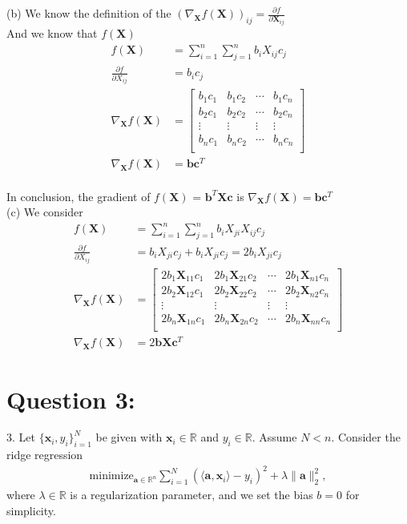 \documentclass[a4paper,12pt]{article}
\newcommand{\R}{\mathbb{R}}
\begin{document}
(b) 
We know the definition of the \((\nabla_{\bm{X}} f(\bm{X}))_{ij} = \frac{\partial f}{\partial \bm{X}_{ij}} \) \\
And we know that \(f(\bm{X})\)
\begin{align*}
    f(\bm{X}) &= \sum_{i=1}^{n}\sum_{j=1}^{n} b_iX_{ij}c_j \\
    \frac{\partial f}{\partial X_{ij}} &= b_ic_j \\ 
    \nabla_{\bm{X}} f(\bm{X}) &= \begin{bmatrix}
        b_1c_1 & b_1c_2 & \cdots & b_1c_n \\
        b_2c_1 & b_2c_2 & \cdots & b_2c_n \\
        \vdots &\vdots & \vdots &\vdots \\
        b_nc_1 & b_nc_2 & \cdots & b_nc_n \\
    \end{bmatrix} \\
    \nabla_{\bm{X}} f(\bm{X}) &= \bm{b}\bm{c}^T
\end{align*} \\
In conclusion, the gradient of \(f(\bm{X})\) = \(\bm{b}^T\bm{X}\bm{c}\) is \(\nabla_{\bm{X}} f(\bm{X}) = \bm{b}\bm{c}^T\) \\

(c) We consider\\
\begin{align*}
    f(\bm{X}) &= \sum_{i=1}^{n}\sum_{j=1}^{n} b_iX_{ji}X_{ij}c_j \\
    \frac{\partial f}{\partial X_{ij}} &= b_iX_{ji}c_j + b_iX_{ji}c_j = 2b_iX_{ji}c_j    \\ 
    \nabla_{\bm{X}} f(\bm{X}) &= \begin{bmatrix}
        2b_1\bm{X}_{11}c_1 & 2b_1\bm{X}_{21}c_2 & \cdots & 2b_1\bm{X}_{n1}c_n \\
        2b_2\bm{X}_{12}c_1 & 2b_2\bm{X}_{22}c_2 & \cdots & 2b_2\bm{X}_{n2}c_n \\
        \vdots &\vdots & \vdots &\vdots \\
        2b_n\bm{X}_{1n}c_1 & 2b_n\bm{X}_{2n}c_2 & \cdots & 2b_n\bm{X}_{nn}c_n \\
    \end{bmatrix} \\
    \nabla_{\bm{X}} f(\bm{X}) &= 2\bm{b}\bm{X}\bm{c}^T
\end{align*}



\section*{Question 3:}
3. Let \(\{\bm{x}_i, y_i\}_{i = 1}^N\) be given with \(\bm{x}_i \in \R\) and \(y_i \in \R\). Assume \(N < n\). Consider the ridge regression \begin{align*}
    \text{minimize}_{\bm{a}\in\R^n} \sum_{i = 1}^N (\langle \bm{a}, \bm{x}_i\rangle - y_i)^2 + \lambda\|\bm{a}\|_2^2,
\end{align*}
where \(\lambda \in \R\) is a regularization parameter, and we set the bias \(b = 0\) for simplicity. \\
\end{document}
